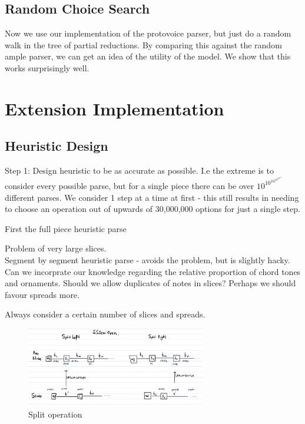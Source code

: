 \documentclass[12pt,a4paper,twoside,openright]{report}
\theoremstyle{definition}
\begin{document}
\FloatBarrier
\subsection{Random Choice Search}
Now we use our implementation of the protovoice parser, but just do a random walk in the tree of partial reductions. By comparing this against the random ample parser, we can get an idea of the utility of the model. We show that this works surprisingly well.

\FloatBarrier
\section{Extension Implementation}

\subsection{Heuristic Design}
Step 1: Design heuristic to be as accurate as possible. I.e the extreme is to consider every possible parse, but for a single piece there can be over $10^{10^{10^{10^{10^{10}}}}}$ different parses. We consider 1 step at a time at first - this still results in needing to choose an operation out of upwards of 30,000,000 options for just a single step.     
\par
First the full piece heuristic parse 
\par
Problem of very large slices.\\ 
Segment by segment heuristic parse - avoids the problem, but is slightly hacky. Can we incorprate our knowledge regarding the relative proportion of chord tones and ornaments. Should we allow duplicates of notes in slices? Perhaps we should favour spreads more. 
\par
Always consider a certain number of slices and spreads.
\par

\begin{figure}[ht]
  \centering
  \includegraphics[width=0.7\textwidth]{splitsssemiopen}
  \caption{Split operation}
  \label{fig:splitoperation}
\end{figure}
\end{document}
